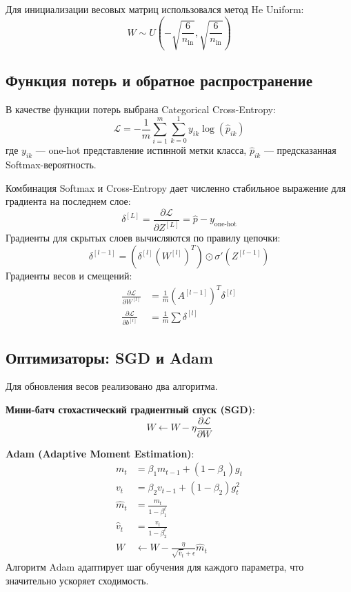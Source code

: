 \documentclass[a4paper,14pt]{extarticle}
\begin{document}
Для инициализации весовых матриц использовался метод He Uniform:
\begin{equation}
    W \sim U\left(-\sqrt{\frac{6}{n_{\text{in}}}}, \sqrt{\frac{6}{n_{\text{in}}}}\right)
\end{equation}

\subsection{Функция потерь и обратное распространение}
В качестве функции потерь выбрана Categorical Cross-Entropy:
\begin{equation}
    \mathcal{L} = -\frac{1}{m} \sum_{i=1}^{m} \sum_{k=0}^{1} y_{ik} \log(\hat{p}_{ik})
\end{equation}
где $y_{ik}$ — one-hot представление истинной метки класса, $\hat{p}_{ik}$ — предсказанная Softmax-вероятность.

Комбинация Softmax и Cross-Entropy дает численно стабильное выражение для градиента на последнем слое:
\begin{equation}
    \delta^{[L]} = \frac{\partial \mathcal{L}}{\partial Z^{[L]}} = \hat{p} - y_{\text{one-hot}}
\end{equation}
Градиенты для скрытых слоев вычисляются по правилу цепочки:
\begin{equation}
    \delta^{[l-1]} = \left(\delta^{[l]} (W^{[l]})^T\right) \odot \sigma'(Z^{[l-1]})
\end{equation}
Градиенты весов и смещений:
\begin{align}
    \frac{\partial \mathcal{L}}{\partial W^{[l]}} &= \frac{1}{m}(A^{[l-1]})^T \delta^{[l]} \\
    \frac{\partial \mathcal{L}}{\partial b^{[l]}} &= \frac{1}{m}\sum \delta^{[l]}
\end{align}

\subsection{Оптимизаторы: SGD и Adam}
Для обновления весов реализовано два алгоритма.

\textbf{Мини-батч стохастический градиентный спуск (SGD)}:
\begin{equation}
    W \leftarrow W - \eta \frac{\partial \mathcal{L}}{\partial W}
\end{equation}

\textbf{Adam (Adaptive Moment Estimation)}:
\begin{align}
    m_t &= \beta_1 m_{t-1} + (1 - \beta_1) g_t \\
    v_t &= \beta_2 v_{t-1} + (1 - \beta_2) g_t^2 \\
    \hat{m}_t &= \frac{m_t}{1 - \beta_1^t} \\
    \hat{v}_t &= \frac{v_t}{1 - \beta_2^t} \\
    W &\leftarrow W - \frac{\eta}{\sqrt{\hat{v}_t} + \epsilon} \hat{m}_t
\end{align}
Алгоритм Adam адаптирует шаг обучения для каждого параметра, что значительно ускоряет сходимость.
\end{document}
